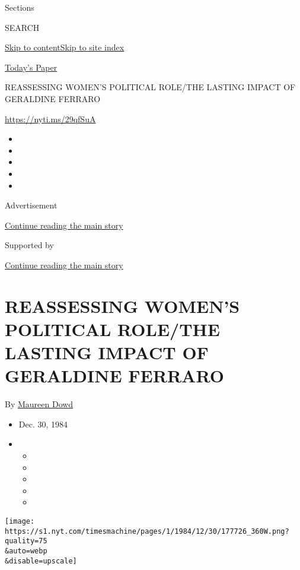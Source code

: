 Sections

SEARCH

\protect\hyperlink{site-content}{Skip to
content}\protect\hyperlink{site-index}{Skip to site index}

\href{https://myaccount.nytimes.com/auth/login?response_type=cookie\&client_id=vi}{}

\href{https://www.nytimes.com/section/todayspaper}{Today's Paper}

REASSESSING WOMEN'S POLITICAL ROLE/THE LASTING IMPACT OF GERALDINE
FERRARO

\href{https://nyti.ms/29qfSuA}{https://nyti.ms/29qfSuA}

\begin{itemize}
\item
\item
\item
\item
\item
\end{itemize}

Advertisement

\protect\hyperlink{after-top}{Continue reading the main story}

Supported by

\protect\hyperlink{after-sponsor}{Continue reading the main story}

\hypertarget{reassessing-womens-political-rolethe-lasting-impact-of-geraldine-ferraro}{%
\section{REASSESSING WOMEN'S POLITICAL ROLE/THE LASTING IMPACT OF
GERALDINE
FERRARO}\label{reassessing-womens-political-rolethe-lasting-impact-of-geraldine-ferraro}}

By \href{https://www.nytimes.com/by/maureen-dowd}{Maureen Dowd}

\begin{itemize}
\item
  Dec. 30, 1984
\item
  \begin{itemize}
  \item
  \item
  \item
  \item
  \item
  \end{itemize}
\end{itemize}

\texttt{[image: https://s1.nyt.com/timesmachine/pages/1/1984/12/30/177726\_360W.png?quality=75\\\&auto=webp\\\&disable=upscale]}

